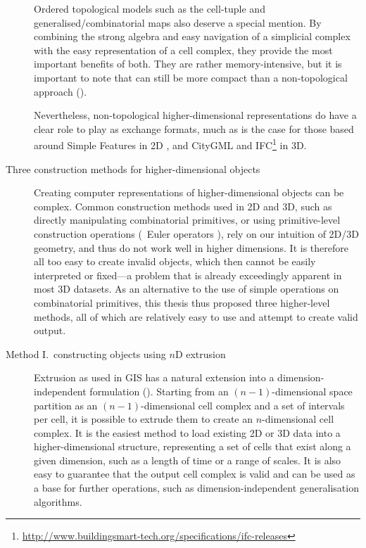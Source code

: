 \begin{description}
Ordered topological models such as the cell-tuple \citep{Brisson93} and generalised/combinatorial maps \citep{Lienhardt94} also deserve a special mention.
By combining the strong algebra and easy navigation of a simplicial complex with the easy representation of a cell complex, they provide the most important benefits of both.
They are rather memory-intensive, but it is important to note that can still be more compact than a non-topological approach ().

Nevertheless, non-topological higher-dimensional representations do have a clear role to play as exchange formats, much as is the case for those based around Simple Features in 2D \citep{SimpleFeatures1}, and CityGML \citep{CityGML2} and IFC\footnote{\url{http://www.buildingsmart-tech.org/specifications/ifc-releases}} in 3D.

\item[Three construction methods for higher-dimensional objects]

Creating computer representations of higher-dimensional objects can be complex.
Common construction methods used in 2D and 3D, such as directly manipulating combinatorial primitives, or using primitive-level construction operations (\eg\ Euler operators \citep{Mantyla88}), rely on our intuition of 2D/3D geometry, and thus do not work well in higher dimensions.
It is therefore all too easy to create invalid objects, which then cannot be easily interpreted or fixed---a problem that is already exceedingly apparent in most 3D datasets.
As an alternative to the use of simple operations on combinatorial primitives, this thesis thus proposed three higher-level methods, all of which are relatively easy to use and attempt to create valid output.


\item[Method I.\ constructing objects using $n$D extrusion]
\hspace{15mm}
Extrusion as used in GIS has a natural extension into a dimension-independent formulation ().
Starting from an $(n-1)$-dimensional space partition as an $(n-1)$-dimensional cell complex and a set of intervals per cell, it is possible to extrude them to create an $n$-dimensional cell complex.
It is the easiest method to load existing 2D or 3D data into a higher-dimensional structure, representing a set of cells that exist along a given dimension, such as a length of time or a range of scales.
It is also easy to guarantee that the output cell complex is valid and can be used as a base for further operations, such as dimension-independent generalisation algorithms.


\end{description}
